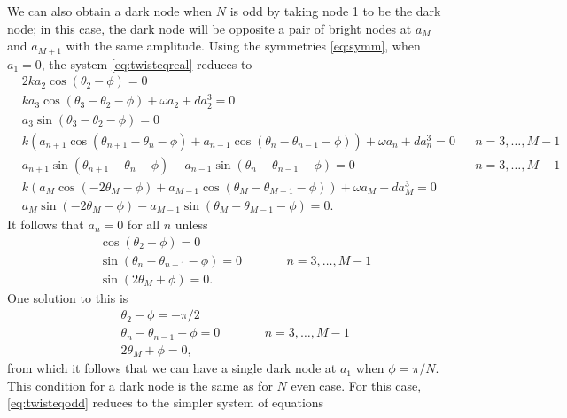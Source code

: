 \documentclass[12pt]{article}
\begin{document}
We can also obtain a dark node when $N$ is odd by taking node 1 to be the dark node; in this case, the dark node will be opposite a pair of bright nodes at $a_M$ and $a_{M+1}$ with the same amplitude. Using the symmetries \cref{eq:symm}, when $a_1 = 0$, the system \cref{eq:twisteqreal} reduces to 
\begin{equation}\label{eq:twisteqodd}
\begin{aligned}
&2 k a_2 \cos(\theta_2 - \phi) = 0 \\
&k a_3 \cos(\theta_3-\theta_2-\phi) + \omega a_2 + d a_2^3 = 0 \\
&a_3 \sin(\theta_3-\theta_2-\phi) = 0 \\
&k\left( a_{n+1} \cos(\theta_{n+1}-\theta_n-\phi) + a_{n-1} \cos(\theta_n - \theta_{n-1}-\phi)\right) + \omega a_n + d a_n^3 = 0 && n = 3, \dots, M-1 \\
&a_{n+1} \sin(\theta_{n+1}-\theta_n-\phi) - a_{n-1} \sin(\theta_n - \theta_{n-1}-\phi) = 0 && n = 3, \dots, M-1 \\
&k ( a_M \cos(-2 \theta_M - \phi) + a_{M-1} \cos(\theta_M - \theta_{M-1} - \phi)) + \omega a_M + d a_M^3 = 0 \\
& a_M \sin(-2 \theta_M - \phi) - a_{M-1} \sin(\theta_M - \theta_{M-1} - \phi) = 0.
\end{aligned}
\end{equation}
It follows that $a_n = 0$ for all $n$ unless
\begin{equation}\label{eq:odddarknodecond}
\begin{aligned}
&\cos(\theta_2 - \phi) = 0 \\
&\sin(\theta_{n} - \theta_{n-1} - \phi) = 0 && \qquad n = 3, \dots, M-1 \\
&\sin(2 \theta_M + \phi) = 0.
\end{aligned}
\end{equation}
One solution to this is
\begin{equation}\label{eq:odddarknodecond1}
\begin{aligned}
&\theta_2 - \phi = -\pi/2 \\
&\theta_{n} - \theta_{n-1} - \phi = 0 && \qquad n = 3, \dots, M-1 \\
&2 \theta_M + \phi = 0,
\end{aligned}
\end{equation}
from which it follows that we can have a single dark node at $a_1$ when $\phi = \pi/N$. This condition for a dark node is the same as for $N$ even case. For this case, \cref{eq:twisteqodd} reduces to the simpler system of equations
\end{document}
